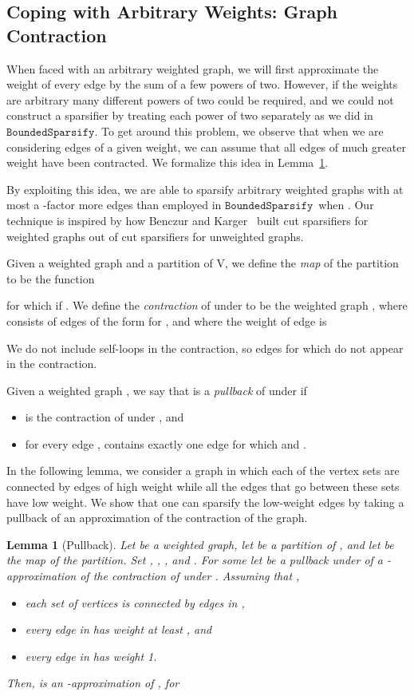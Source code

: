 \documentclass[11pt]{article}
\newtheorem{lemma}[theorem]{Lemma}
\newcommand{\boundedsparsify}{\ensuremath{\mathtt{BoundedSparsify}}}
\begin{document}
\subsection{Coping with Arbitrary Weights: Graph Contraction}\label{}

When faced with an arbitrary weighted graph, we will
  first approximate the weight of every edge by the sum of a
  few powers of two.
However, if the weights are arbitrary many different powers
  of two could be required, and we could not construct a sparsifier
  by treating each power of two separately as we did in
  \boundedsparsify .
To get around this problem, we observe that when we are considering
  edges of a given weight, we can assume that all edges of much greater
  weight have been contracted.
We formalize this idea in Lemma~\ref{lem:pullback}.

By exploiting this idea, we are able to
  sparsify arbitrary weighted graphs with at most a -factor
  more edges than employed in \boundedsparsify \ when .
Our technique is inspired by how Benczur and Karger~\cite{BenczurKarger}
  built cut sparsifiers for weighted graphs out of
  cut sparsifiers for unweighted graphs.


Given a weighted graph  and a partition  of V,
  we define the \textit{map} of the partition to be the function

for which  if .
We define the \textit{contraction} of  under  to be the weighted graph
  , where  consists of edges of the form
   for , and where the weight of edge
   is

We do not include self-loops in the contraction, so
  edges  for which  do not appear in the contraction.

Given a weighted graph ,
  we say that 
  is a \textit{pullback} of  under  if
\begin{itemize}
\item [1.]   is the contraction of  under , and
\item [2.]  for every edge
  ,  contains exactly one edge 
  for which  and .
\end{itemize}

In the following lemma, we consider a graph in which each of the vertex
  sets  are connected by edges of high weight while
  all the edges that go between these sets have low weight.
We show that one can sparsify the low-weight edges by taking a pullback
  of an approximation of the contraction of the graph.

\begin{lemma}[Pullback]\label{lem:pullback}
Let  be a weighted graph, let 
  be a partition of , and let  be the map of the partition.
Set ,
  ,
  , and
  .
For some  let
  be a pullback under  of a
  -approximation of the contraction of  under .
Assuming that ,
\begin{itemize}
\item [1.] each set of vertices  is connected by edges in ,
\item [2.] every edge in  has weight at least , and
\item [3.] every edge in  has weight 1.
\end{itemize}
Then,  is an -approximation of ,
  for

\end{lemma}
\end{document}

